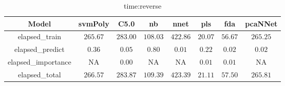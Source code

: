 \begin{table}[!ht]
	\centering
	\begin{tabular}{|c|c|c|c|c|c|c|c|}
		\hline
		Model & svmPoly & C5.0 & nb & nnet & pls & fda & pcaNNet \\ \hline
		elapsed_train & $265.67$ & $283.00$ & $108.03$ & $422.86$ & $20.07$ & $56.67$ & $265.25$ \\ \hline
		elapsed_predict & $0.36$ & $0.05$ & $0.80$ & $0.01$ & $0.22$ & $0.02$ & $0.02$ \\ \hline
		elapsed_importance & NA & $0.00$ & NA & NA & $0.01$ & $0.01$ & NA \\ \hline
		elapsed_total & $266.57$ & $283.87$ & $109.39$ & $423.39$ & $21.11$ & $57.50$ & $265.81$ \\ \hline
	\end{tabular}
	\caption{time:reverse}
	\label{tab:time:reverse}
\end{table}
